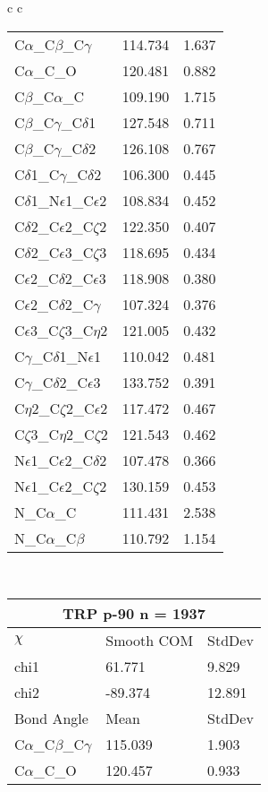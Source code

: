 \begin{longtable}{ c c }
\begin{tabular}{ l l l }
  C$\alpha$\_C$\beta$\_C$\gamma$ & 114.734 & 1.637\\
  C$\alpha$\_C\_O & 120.481 & 0.882\\
  C$\beta$\_C$\alpha$\_C & 109.190 & 1.715\\
  C$\beta$\_C$\gamma$\_C$\delta$1 & 127.548 & 0.711\\
  C$\beta$\_C$\gamma$\_C$\delta$2 & 126.108 & 0.767\\
  C$\delta$1\_C$\gamma$\_C$\delta$2 & 106.300 & 0.445\\
  C$\delta$1\_N$\epsilon$1\_C$\epsilon$2 & 108.834 & 0.452\\
  C$\delta$2\_C$\epsilon$2\_C$\zeta$2 & 122.350 & 0.407\\
  C$\delta$2\_C$\epsilon$3\_C$\zeta$3 & 118.695 & 0.434\\
  C$\epsilon$2\_C$\delta$2\_C$\epsilon$3 & 118.908 & 0.380\\
  C$\epsilon$2\_C$\delta$2\_C$\gamma$ & 107.324 & 0.376\\
  C$\epsilon$3\_C$\zeta$3\_C$\eta$2 & 121.005 & 0.432\\
  C$\gamma$\_C$\delta$1\_N$\epsilon$1 & 110.042 & 0.481\\
  C$\gamma$\_C$\delta$2\_C$\epsilon$3 & 133.752 & 0.391\\
  C$\eta$2\_C$\zeta$2\_C$\epsilon$2 & 117.472 & 0.467\\
  C$\zeta$3\_C$\eta$2\_C$\zeta$2 & 121.543 & 0.462\\
  N$\epsilon$1\_C$\epsilon$2\_C$\delta$2 & 107.478 & 0.366\\
  N$\epsilon$1\_C$\epsilon$2\_C$\zeta$2 & 130.159 & 0.453\\
  N\_C$\alpha$\_C & 111.431 & 2.538\\
  N\_C$\alpha$\_C$\beta$ & 110.792 & 1.154\\
  \bottomrule
  \end{tabular}
  \\
  \begin{tabular}{ l l l }
  \toprule
  \multicolumn{3}{c}{TRP \textbf{p-90} n = 1937} \\ \toprule
  $\chi$       & Smooth COM & StdDev \\ \midrule
  chi1 & 61.771 & 9.829 \\ 
  chi2 & -89.374 & 12.891 \\ \midrule
  Bond Angle   & Mean     & StdDev \\ \midrule
  C$\alpha$\_C$\beta$\_C$\gamma$ & 115.039 & 1.903\\
  C$\alpha$\_C\_O & 120.457 & 0.933\\

\end{tabular}
\end{longtable}
